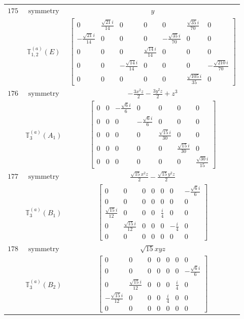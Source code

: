 \documentclass[fleqn,8pt,landscape]{jsarticle}
\begin{document}
\begin{longtable}{ccc}
$ 175 $ & $ \text{symmetry} $ & $ y $ \\
$  $ & $ \mathbb{T}_{1,2}^{(a)}(E) $ & $ \begin{bmatrix} 0 & \frac{\sqrt{21} i}{14} & 0 & 0 & 0 & \frac{\sqrt{35} i}{70} & 0 \\ - \frac{\sqrt{21} i}{14} & 0 & 0 & 0 & - \frac{\sqrt{35} i}{70} & 0 & 0 \\ 0 & 0 & 0 & \frac{\sqrt{14} i}{14} & 0 & 0 & 0 \\ 0 & 0 & - \frac{\sqrt{14} i}{14} & 0 & 0 & 0 & - \frac{\sqrt{210} i}{70} \\ 0 & 0 & 0 & 0 & 0 & \frac{\sqrt{105} i}{35} & 0 \end{bmatrix} $ \\ \hline
$ 176 $ & $ \text{symmetry} $ & $ - \frac{3 x^{2} z}{2} - \frac{3 y^{2} z}{2} + z^{3} $ \\
$  $ & $ \mathbb{T}_{3}^{(a)}(A_{1}) $ & $ \begin{bmatrix} 0 & 0 & - \frac{\sqrt{6} i}{6} & 0 & 0 & 0 & 0 \\ 0 & 0 & 0 & - \frac{\sqrt{6} i}{6} & 0 & 0 & 0 \\ 0 & 0 & 0 & 0 & \frac{\sqrt{15} i}{30} & 0 & 0 \\ 0 & 0 & 0 & 0 & 0 & \frac{\sqrt{15} i}{30} & 0 \\ 0 & 0 & 0 & 0 & 0 & 0 & \frac{\sqrt{30} i}{15} \end{bmatrix} $ \\ \hline
$ 177 $ & $ \text{symmetry} $ & $ \frac{\sqrt{15} x^{2} z}{2} - \frac{\sqrt{15} y^{2} z}{2} $ \\
$  $ & $ \mathbb{T}_{3}^{(a)}(B_{1}) $ & $ \begin{bmatrix} 0 & 0 & 0 & 0 & 0 & 0 & - \frac{\sqrt{6} i}{6} \\ 0 & 0 & 0 & 0 & 0 & 0 & 0 \\ \frac{\sqrt{15} i}{12} & 0 & 0 & 0 & \frac{i}{4} & 0 & 0 \\ 0 & \frac{\sqrt{15} i}{12} & 0 & 0 & 0 & - \frac{i}{4} & 0 \\ 0 & 0 & 0 & 0 & 0 & 0 & 0 \end{bmatrix} $ \\ \hline
$ 178 $ & $ \text{symmetry} $ & $ \sqrt{15} x y z $ \\
$  $ & $ \mathbb{T}_{3}^{(a)}(B_{2}) $ & $ \begin{bmatrix} 0 & 0 & 0 & 0 & 0 & 0 & 0 \\ 0 & 0 & 0 & 0 & 0 & 0 & - \frac{\sqrt{6} i}{6} \\ 0 & \frac{\sqrt{15} i}{12} & 0 & 0 & 0 & \frac{i}{4} & 0 \\ - \frac{\sqrt{15} i}{12} & 0 & 0 & 0 & \frac{i}{4} & 0 & 0 \\ 0 & 0 & 0 & 0 & 0 & 0 & 0 \end{bmatrix} $ \\ \hline

\end{longtable}
\end{document}
